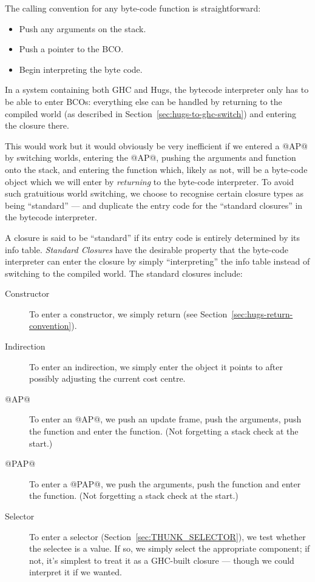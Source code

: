 \documentclass[11pt]{article}
\newcommand{\secref}[1]{Section~\ref{sec:#1}}
\begin{document}
The calling convention for any byte-code function is straightforward:
\begin{itemize}
\item Push any arguments on the stack.
\item Push a pointer to the BCO.
\item Begin interpreting the byte code.
\end{itemize}

In a system containing both GHC and Hugs, the bytecode interpreter
only has to be able to enter BCOs: everything else can be handled by
returning to the compiled world (as described in
\secref{hugs-to-ghc-switch}) and entering the closure
there.

This would work but it would obviously be very inefficient if we
entered a @AP@ by switching worlds, entering the @AP@, pushing the
arguments and function onto the stack, and entering the function
which, likely as not, will be a byte-code object which we will enter
by \emph{returning} to the byte-code interpreter.  To avoid such
gratuitious world switching, we choose to recognise certain closure
types as being ``standard'' --- and duplicate the entry code for the
``standard closures'' in the bytecode interpreter.

A closure is said to be ``standard'' if its entry code is entirely
determined by its info table.  \emph{Standard Closures} have the
desirable property that the byte-code interpreter can enter the
closure by simply ``interpreting'' the info table instead of switching
to the compiled world.  The standard closures include:

\begin{description}
\item[Constructor] To enter a constructor, we simply return (see
\secref{hugs-return-convention}).

\item[Indirection]
To enter an indirection, we simply enter the object it points to
after possibly adjusting the current cost centre.

\item[@AP@] 

To enter an @AP@, we push an update frame, push the
arguments, push the function and enter the function.
(Not forgetting a stack check at the start.)

\item[@PAP@]

To enter a @PAP@, we push the arguments, push the function and enter
the function.  (Not forgetting a stack check at the start.)

\item[Selector]

To enter a selector (\secref{THUNK_SELECTOR}), we test whether the
selectee is a value.  If so, we simply select the appropriate
component; if not, it's simplest to treat it as a GHC-built closure
--- though we could interpret it if we wanted.

\end{description}
\end{document}
